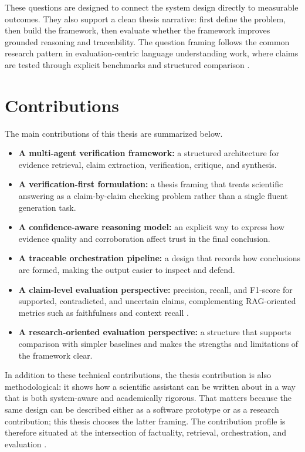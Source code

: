 These questions are designed to connect the system design directly to measurable outcomes. They also support a clean thesis narrative: first define the problem, then build the framework, then evaluate whether the framework improves grounded reasoning and traceability.
The question framing follows the common research pattern in evaluation-centric language understanding work, where claims are tested through explicit benchmarks and structured comparison \cite{rajpurkar2016squad,joshi2017triviaqa,yang2018hotpotqa}.

\section{Contributions}

The main contributions of this thesis are summarized below.
\begin{itemize}[leftmargin=*]
    \item \textbf{A multi-agent verification framework:} a structured architecture for evidence retrieval, claim extraction, verification, critique, and synthesis.
    \item \textbf{A verification-first formulation:} a thesis framing that treats scientific answering as a claim-by-claim checking problem rather than a single fluent generation task.
    \item \textbf{A confidence-aware reasoning model:} an explicit way to express how evidence quality and corroboration affect trust in the final conclusion.
    \item \textbf{A traceable orchestration pipeline:} a design that records how conclusions are formed, making the output easier to inspect and defend.
    \item \textbf{A claim-level evaluation perspective:} precision, recall, and F1-score for supported, contradicted, and uncertain claims, complementing RAG-oriented metrics such as faithfulness and context recall \cite{es2023ragas,lin2021truthfulqa}.
    \item \textbf{A research-oriented evaluation perspective:} a structure that supports comparison with simpler baselines and makes the strengths and limitations of the framework clear.
\end{itemize}

In addition to these technical contributions, the thesis contribution is also methodological: it shows how a scientific assistant can be written about in a way that is both system-aware and academically rigorous. That matters because the same design can be described either as a software prototype or as a research contribution; this thesis chooses the latter framing.
The contribution profile is therefore situated at the intersection of factuality, retrieval, orchestration, and evaluation \cite{ragsurvey2024,ji2023hallucination,es2023ragas}.

